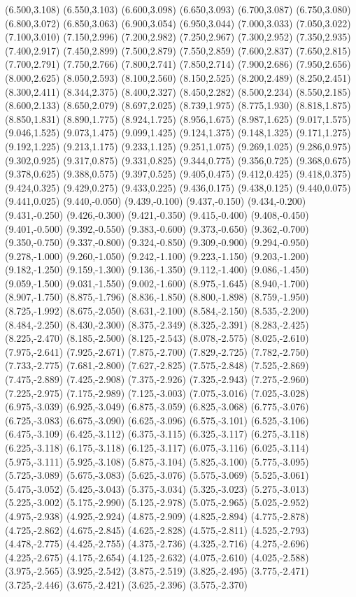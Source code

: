 (6.500,3.108) (6.550,3.103) (6.600,3.098) (6.650,3.093) (6.700,3.087) (6.750,3.080) (6.800,3.072) (6.850,3.063) (6.900,3.054) (6.950,3.044) (7.000,3.033) (7.050,3.022) (7.100,3.010) (7.150,2.996) (7.200,2.982) (7.250,2.967) (7.300,2.952) (7.350,2.935) (7.400,2.917) (7.450,2.899) (7.500,2.879) (7.550,2.859) (7.600,2.837) (7.650,2.815) (7.700,2.791) (7.750,2.766) (7.800,2.741) (7.850,2.714) (7.900,2.686) (7.950,2.656) (8.000,2.625) (8.050,2.593) (8.100,2.560) (8.150,2.525) (8.200,2.489) (8.250,2.451) (8.300,2.411) (8.344,2.375) (8.400,2.327) (8.450,2.282) (8.500,2.234) (8.550,2.185) (8.600,2.133) (8.650,2.079) (8.697,2.025) (8.739,1.975) (8.775,1.930) (8.818,1.875) (8.850,1.831) (8.890,1.775) (8.924,1.725) (8.956,1.675) (8.987,1.625) (9.017,1.575) (9.046,1.525) (9.073,1.475) (9.099,1.425) (9.124,1.375) (9.148,1.325) (9.171,1.275) (9.192,1.225) (9.213,1.175) (9.233,1.125) (9.251,1.075) (9.269,1.025) (9.286,0.975) (9.302,0.925) (9.317,0.875) (9.331,0.825) (9.344,0.775) (9.356,0.725) (9.368,0.675) (9.378,0.625) (9.388,0.575) (9.397,0.525) (9.405,0.475) (9.412,0.425) (9.418,0.375) (9.424,0.325) (9.429,0.275) (9.433,0.225) (9.436,0.175) (9.438,0.125) (9.440,0.075) (9.441,0.025) (9.440,-0.050) (9.439,-0.100) (9.437,-0.150) (9.434,-0.200) (9.431,-0.250) (9.426,-0.300) (9.421,-0.350) (9.415,-0.400) (9.408,-0.450) (9.401,-0.500) (9.392,-0.550) (9.383,-0.600) (9.373,-0.650) (9.362,-0.700) (9.350,-0.750) (9.337,-0.800) (9.324,-0.850) (9.309,-0.900) (9.294,-0.950) (9.278,-1.000) (9.260,-1.050) (9.242,-1.100) (9.223,-1.150) (9.203,-1.200) (9.182,-1.250) (9.159,-1.300) (9.136,-1.350) (9.112,-1.400) (9.086,-1.450) (9.059,-1.500) (9.031,-1.550) (9.002,-1.600) (8.975,-1.645) (8.940,-1.700) (8.907,-1.750) (8.875,-1.796) (8.836,-1.850) (8.800,-1.898) (8.759,-1.950) (8.725,-1.992) (8.675,-2.050) (8.631,-2.100) (8.584,-2.150) (8.535,-2.200) (8.484,-2.250) (8.430,-2.300) (8.375,-2.349) (8.325,-2.391) (8.283,-2.425) (8.225,-2.470) (8.185,-2.500) (8.125,-2.543) (8.078,-2.575) (8.025,-2.610) (7.975,-2.641) (7.925,-2.671) (7.875,-2.700) (7.829,-2.725) (7.782,-2.750) (7.733,-2.775) (7.681,-2.800) (7.627,-2.825) (7.575,-2.848) (7.525,-2.869) (7.475,-2.889) (7.425,-2.908) (7.375,-2.926) (7.325,-2.943) (7.275,-2.960) (7.225,-2.975) (7.175,-2.989) (7.125,-3.003) (7.075,-3.016) (7.025,-3.028) (6.975,-3.039) (6.925,-3.049) (6.875,-3.059) (6.825,-3.068) (6.775,-3.076) (6.725,-3.083) (6.675,-3.090) (6.625,-3.096) (6.575,-3.101) (6.525,-3.106) (6.475,-3.109) (6.425,-3.112) (6.375,-3.115) (6.325,-3.117) (6.275,-3.118) (6.225,-3.118) (6.175,-3.118) (6.125,-3.117) (6.075,-3.116) (6.025,-3.114) (5.975,-3.111) (5.925,-3.108) (5.875,-3.104) (5.825,-3.100) (5.775,-3.095) (5.725,-3.089) (5.675,-3.083) (5.625,-3.076) (5.575,-3.069) (5.525,-3.061) (5.475,-3.052) (5.425,-3.043) (5.375,-3.034) (5.325,-3.023) (5.275,-3.013) (5.225,-3.002) (5.175,-2.990) (5.125,-2.978) (5.075,-2.965) (5.025,-2.952) (4.975,-2.938) (4.925,-2.924) (4.875,-2.909) (4.825,-2.894) (4.775,-2.878) (4.725,-2.862) (4.675,-2.845) (4.625,-2.828) (4.575,-2.811) (4.525,-2.793) (4.478,-2.775) (4.425,-2.755) (4.375,-2.736) (4.325,-2.716) (4.275,-2.696) (4.225,-2.675) (4.175,-2.654) (4.125,-2.632) (4.075,-2.610) (4.025,-2.588) (3.975,-2.565) (3.925,-2.542) (3.875,-2.519) (3.825,-2.495) (3.775,-2.471) (3.725,-2.446) (3.675,-2.421) (3.625,-2.396) (3.575,-2.370) 
